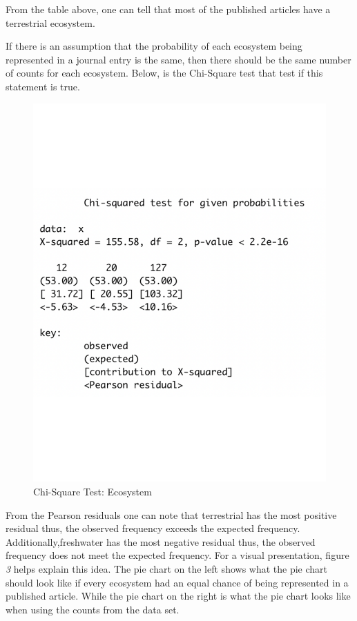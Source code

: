 \documentclass[
]{article}
\begin{document}
From the table above, one can tell that most of the published articles
have a terrestrial ecosystem.

If there is an assumption that the probability of each ecosystem being
represented in a journal entry is the same, then there should be the
same number of counts for each ecosystem. Below, is the Chi-Square test
that test if this statement is true.

\begin{figure}
  \caption{Chi-Square Test: Ecosystem}
    \includegraphics[width=13cm]{chi-eco-1.pdf}
\end{figure}

From the Pearson residuals one can note that terrestrial has the most
positive residual thus, the observed frequency exceeds the expected
frequency. Additionally,freshwater has the most negative residual thus,
the observed frequency does not meet the expected frequency. For a
visual presentation, figure \emph{3} helps explain this idea. The pie
chart on the left shows what the pie chart should look like if every
ecosystem had an equal chance of being represented in a published
article. While the pie chart on the right is what the pie chart looks
like when using the counts from the data set.
\end{document}
